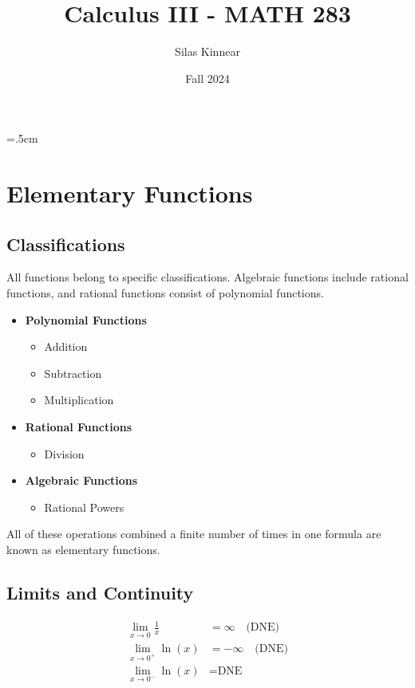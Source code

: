 \documentclass[a4paper,12pt,openany]{book}
\begin{document}
\title{Calculus III - MATH 283}
\author{Silas Kinnear}
\date{Fall 2024}
\maketitle

\tableofcontents
{}
\parskip=.5cm
\parindent=0cm
\chapter{Elementary Functions}

\section{Classifications}
All functions belong to specific classifications. Algebraic functions include rational functions, and rational functions consist of polynomial functions.

\begin{itemize}
    \item \textbf{Polynomial Functions}
    \begin{itemize}
        \item Addition
        \item Subtraction
        \item Multiplication
    \end{itemize}
    \item \textbf{Rational Functions}
    \begin{itemize}
        \item Division
    \end{itemize}
    \item \textbf{Algebraic Functions}
    \begin{itemize}
        \item Rational Powers
    \end{itemize}
\end{itemize}
All of these operations combined a finite number of times in one formula are known as elementary functions.

\section{Limits and Continuity}

\begin{align*}
    \lim_{x \to 0} \frac{1}{x} &= \infty \quad \text{(DNE)} \\
    \lim_{x \to 0^+} \ln(x) &= -\infty \quad \text{(DNE)} \\
    \lim_{x \to 0^-} \ln(x) &= \text{DNE}
\end{align*}
\end{document}
